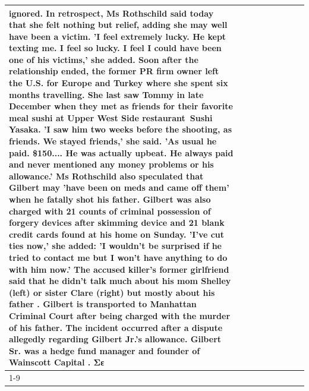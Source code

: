 \begin{table}[H]
\begin{tabular}{lllrlllll}
ignored. In retrospect, Ms Rothschild said today that she felt nothing but relief, adding she may well have been a victim. 'I feel extremely lucky. He kept texting me. I feel so lucky. I feel I could have been one of his victims,' she added. Soon after the relationship ended, the former PR firm owner left the U.S. for Europe and Turkey where she spent six months  travelling. She last saw Tommy in late December when they met as friends for their favorite meal sushi at Upper West Side restaurant Sushi Yasaka. 'I saw him two weeks before the shooting, as friends. We stayed friends,' she said. 'As usual he paid. \$150.... He was actually upbeat. He always paid and never mentioned any money problems or his allowance.' Ms Rothschild also speculated that Gilbert may 'have been on meds and came off them' when he fatally shot his father. Gilbert was also charged with 21 counts of criminal possession of forgery devices after skimming device and 21 blank credit cards found at his home on Sunday. 'I've cut ties now,' she added: 'I wouldn’t be surprised if he tried to contact me but I won’t have anything to do with him now.' The accused killer's former girlfriend said that he didn't talk much about his mom Shelley (left) or sister Clare (right) but mostly about his father . Gilbert is transported to Manhattan Criminal Court  after being charged with the murder of his father. The incident occurred after a dispute allegedly regarding Gilbert Jr.'s allowance. Gilbert Sr. was a hedge fund manager and founder of Wainscott Capital . Σε \\
\cline{1-9}

\end{tabular}
\end{table}
